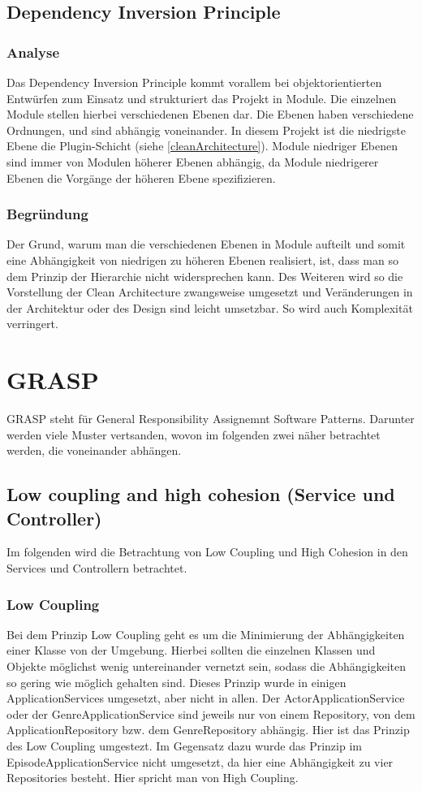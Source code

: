 \subsection{Dependency Inversion Principle}

        \subsubsection{Analyse}
        Das Dependency Inversion Principle kommt vorallem bei objektorientierten Entwürfen zum Einsatz und strukturiert das Projekt in Module. Die einzelnen Module stellen hierbei verschiedenen Ebenen dar. Die Ebenen haben verschiedene Ordnungen, und sind abhängig voneinander. In diesem Projekt ist die niedrigste Ebene die Plugin-Schicht (siehe \cref{cleanArchitecture}). Module niedriger Ebenen sind immer von Modulen höherer Ebenen abhängig, da Module niedrigerer Ebenen die Vorgänge der höheren Ebene spezifizieren.
        
        \subsubsection{Begründung}
        Der Grund, warum man die verschiedenen Ebenen in Module aufteilt und somit eine Abhängigkeit von niedrigen zu höheren Ebenen realisiert, ist, dass man so dem Prinzip der Hierarchie nicht widersprechen kann. Des Weiteren wird so die Vorstellung der Clean Architecture zwangsweise umgesetzt und Veränderungen in der Architektur oder des Design sind leicht umsetzbar. So wird auch Komplexität verringert.

\section{GRASP}
GRASP steht für General Responsibility Assignemnt Software Patterns. Darunter werden viele Muster vertsanden, wovon im folgenden zwei näher betrachtet werden, die voneinander abhängen.

	\subsection{Low coupling and high cohesion (Service und Controller)}
	Im folgenden wird die Betrachtung von Low Coupling und High Cohesion in den Services und Controllern betrachtet.
		\subsubsection{Low Coupling}
			Bei dem Prinzip Low Coupling geht es um die Minimierung der Abhängigkeiten einer Klasse von der Umgebung. Hierbei sollten die einzelnen Klassen und Objekte möglichst wenig untereinander vernetzt sein, sodass die Abhängigkeiten so gering wie möglich gehalten sind. Dieses Prinzip wurde in einigen ApplicationServices umgesetzt, aber nicht in allen. Der ActorApplicationService oder der GenreApplicationService sind jeweils nur von einem Repository, von dem ApplicationRepository bzw. dem GenreRepository abhängig. Hier ist das Prinzip des Low Coupling umgestezt. Im Gegensatz dazu wurde das Prinzip im EpisodeApplicationService nicht umgesetzt, da hier eine Abhängigkeit zu vier Repositories besteht. Hier spricht man von High Coupling.
			
